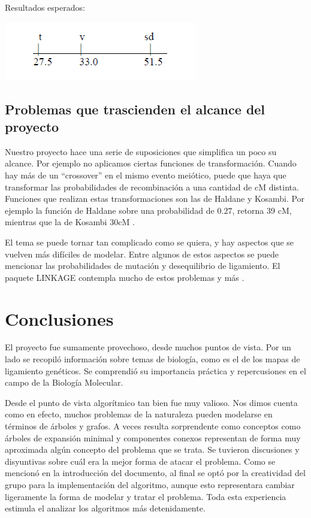 \documentclass{article}
\begin{document}
	Resultados esperados:
	
	\begin{center}
		\includegraphics[scale=1]{images/e_8.png}
	\end{center}
	
	\subsection{Problemas que trascienden el alcance del proyecto}
	
	Nuestro proyecto hace una serie de suposiciones que simplifica un poco su alcance. Por ejemplo no aplicamos ciertas funciones de transformación. Cuando hay más de un ``crossover'' en el mismo evento meiótico, puede que haya que transformar las probabilidades de recombinación a una cantidad de cM distinta. Funciones que realizan estas transformaciones son las de Haldane y Kosambi. Por ejemplo la función de Haldane sobre una probabilidad de $0.27$, retorna 39 cM, mientras que la de Kosambi 30cM \cite{terwilliger1994handbook}.
	
	El tema se puede tornar tan complicado como se quiera, y hay aspectos que se vuelven más difíciles de modelar. Entre algunos de estos aspectos se puede mencionar las probabilidades de mutación y desequilibrio de ligamiento. El paquete LINKAGE contempla mucho de estos problemas y más \cite{terwilliger1994handbook}.
	
	\section{Conclusiones}
	
	El proyecto fue sumamente provechoso, desde muchos puntos de vista. Por un lado se recopiló información sobre temas de biología, como es el de los mapas de ligamiento genéticos. Se comprendió su importancia práctica y repercusiones en el campo de la Biología Molecular.
	
	Desde el punto de vista algorítmico tan bien fue muy valioso. Nos dimos cuenta como en efecto, muchos problemas de la naturaleza pueden modelarse en términos de árboles y grafos. A veces resulta sorprendente como conceptos como árboles de expansión minimal y componentes conexos representan de forma muy aproximada algún concepto del problema que se trata. Se tuvieron discusiones y disyuntivas sobre cuál era la mejor forma de atacar el problema. Como se mencionó en la introducción del documento, al final se optó por la creatividad del grupo para la implementación del algoritmo, aunque esto representara cambiar ligeramente la forma de modelar y tratar el problema. Toda esta experiencia estimula el analizar los algoritmos más detenidamente.
	
\end{document}
